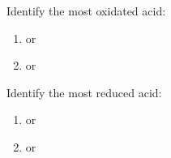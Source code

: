 \documentclass[main.tex]{subfiles}
\begin{document}
\begin{multicols*}{2}
\begin{question}[ID=\the\value{numA}]
Identify the most oxidated acid: 
 \noindent
 \begin{multicols}{2}
  \begin{enumerate} [topsep=0pt, partopsep=1pt, label=(\alph*), leftmargin=0.5cm]	
\item {} or  \iffalse \ce{H3As\textsuperscript{V}O4   } \fi
\item {} or  \iffalse \ce{H4Xe\textsuperscript{VIII}O6} \fi
\end{enumerate}
\end{multicols}
\end{question}
\begin{solution}
\begin{inparaenum}[(a)]
\item   {} 
\item  {}  
 \end{inparaenum}
\hspace{0.1cm}\end{solution}%

\begin{question}[ID=\the\value{numA}]
Identify the most reduced acid: 
 \noindent
  \begin{multicols}{2}
  \begin{enumerate} [topsep=0pt, partopsep=1pt, label=(\alph*), leftmargin=0.5cm]	
\item {} or  \iffalse \ce{H2Ru\textsuperscript{VI}O4} \fi
\item {} or  \iffalse \ce{HTc\textsuperscript{VII}O4} \fi
\end{enumerate}
\end{multicols}
\end{question}
\begin{solution}
\begin{inparaenum}[(a)]
\item   {}  
\item   {}   
 \end{inparaenum}
\hspace{0.1cm}\end{solution}%


\end{multicols*}
\end{document}
